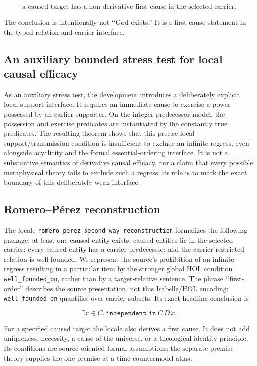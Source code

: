 \documentclass[11pt,a4paper]{article}
\begin{document}
\[
\text{a caused target has a non-derivative first cause in the selected carrier}.
\]

The conclusion is intentionally not \lq\lq God exists.''  It is a first-cause
statement in the typed relation-and-carrier interface.

\subsection{An auxiliary bounded stress test for local causal efficacy}

As an auxiliary stress test, the development introduces a deliberately
explicit local support interface.  It requires an immediate cause to exercise
a power possessed by an earlier supporter.  On the integer predecessor model,
the possession and exercise predicates are instantiated by the constantly true
predicates.  The resulting theorem shows that this precise local
support/transmission condition is insufficient to exclude an infinite regress,
even alongside acyclicity and the formal essential-ordering interface.  It is
not a substantive semantics of derivative causal efficacy, nor a claim that
every possible metaphysical theory fails to exclude such a regress; its role is
to mark the exact boundary of this deliberately weak interface.

\subsection{Romero--Pérez reconstruction}

The locale \texttt{romero\_perez\_second\_way\_reconstruction} formalizes the
following package: at least one caused entity exists; caused entities lie in the
selected carrier; every caused entity has a carrier predecessor; and the
carrier-restricted relation is well-founded.  We represent the source's
prohibition of an infinite regress resulting in a particular item by the
stronger global HOL condition \texttt{well\_founded\_on}, rather than by a
target-relative sentence.  The phrase \lq\lq first-order'' describes the source
presentation, not this Isabelle/HOL encoding: \texttt{well\_founded\_on}
quantifies over carrier subsets.  Its exact headline conclusion is

\[
\exists x\in C.\ \texttt{independent\_in}\ C\ D\ x.
\]

For a specified caused target the locale also derives a first cause.  It does
not add uniqueness, necessity, a cause of the universe, or a theological
identity principle.  Its conditions are source-oriented formal assumptions;
the separate premise theory supplies the one-premise-at-a-time countermodel
atlas.
\end{document}
